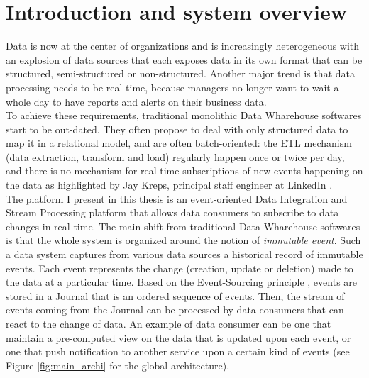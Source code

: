 \chapter{Introduction and system overview}

Data is now at the center of organizations and is increasingly heterogeneous with an explosion of data sources 
that each exposes data in its own format that can be structured, semi-structured or non-structured.
Another major trend is that data processing needs to be real-time, because managers no longer want to wait a whole day 
to have reports and alerts on their business data.
\\

To achieve these requirements, traditional monolithic Data Wharehouse softwares start to be out-dated. They often
propose to deal with only structured data to map it in a relational model, and are often batch-oriented: 
the ETL mechanism (data extraction, transform and load) regularly happen once or twice per day, and there is no mechanism 
for real-time subscriptions of new events happening on the data as highlighted by Jay Kreps, principal staff engineer at LinkedIn .
\\

The platform I present in this thesis is an event-oriented Data Integration and Stream Processing platform that allows data consumers
to subscribe to data changes in real-time. The main shift from traditional Data Wharehouse softwares is that the whole
system is organized around the notion of \textit{immutable event}. Such a data system captures from various data sources
a historical record of immutable events. Each event represents the change (creation, update or deletion) made to the data at a particular time. 
Based on the Event-Sourcing principle , events are stored in a Journal that is an ordered sequence of 
events. Then, the stream of events coming from the Journal can be processed by data consumers that can react to the change of data. 
An example of data consumer can be one that maintain a pre-computed view on the data that is updated upon each event, or one that push 
notification to another service upon a certain kind of events (see Figure \ref{fig:main_archi} for the global architecture).
\\

